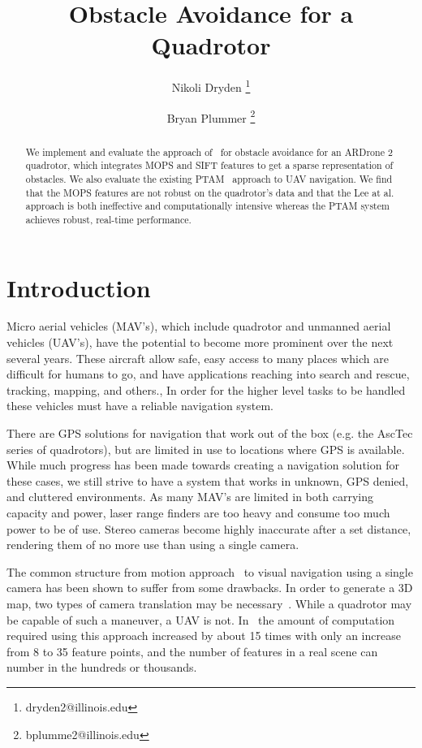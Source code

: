 \documentclass{acmsiggraph}
\title{Obstacle Avoidance for a Quadrotor}
\author{Nikoli Dryden \thanks{dryden2@illinois.edu} %
\and Bryan Plummer \thanks{bplumme2@illinois.edu}}
\begin{document}
\maketitle

\begin{abstract}
We implement and evaluate the approach of~\cite{lee2011} for obstacle avoidance for an ARDrone 2 quadrotor, which integrates MOPS and SIFT features to get a sparse representation of obstacles. We also evaluate the existing PTAM~\cite{klein07parallel} approach to UAV navigation. We find that the MOPS features are not robust on the quadrotor's data and that the Lee at al. approach is both ineffective and computationally intensive whereas the PTAM system achieves robust, real-time performance.
\end{abstract}

\section{Introduction}
Micro aerial vehicles (MAV's), which include quadrotor and unmanned aerial vehicles (UAV's), have the potential to become more 
prominent over the next several years.  These aircraft allow safe, easy access to many places which are difficult for humans to go, and have applications reaching into search and rescue, tracking, mapping, and others.,
In order for the higher level tasks to be handled these vehicles must have a reliable 
navigation system.

There are GPS solutions for navigation that work out of the box (e.g. the AscTec series of quadrotors), but are limited in use
to locations where GPS is available.  While much progress has been made towards creating a navigation solution
for these cases, we still strive to have a system that works in unknown, GPS denied, and cluttered environments.  As many 
MAV's are limited in both carrying capacity and power, laser range finders are too heavy and consume too much power to be of 
use. Stereo cameras become highly inaccurate after a set distance, rendering them of no more use than using a single camera.

The common structure from motion approach~\cite{dellaert2000} to visual navigation using a single camera has been shown to suffer from some 
drawbacks.  In order to generate a 3D map, two types of camera translation may be necessary~\cite{shah2010}.  While
a quadrotor may be capable of such a maneuver, a UAV is not.  In~\cite{shah2009} the amount of computation required using this 
approach increased by about 15 times with only an increase from 8 to 35 feature points, and the number of features in a real
scene can number in the hundreds or thousands.
\end{document}
